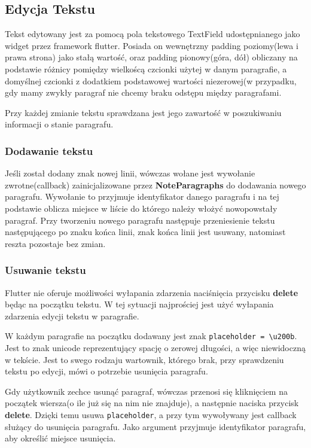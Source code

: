 \subsection{Edycja Tekstu}

Tekst edytowany jest za pomocą pola tekstowego TextField udostępnianego jako widget przez framework flutter. Posiada on wewnętrzny padding poziomy(lewa i prawa strona) jako stałą wartość, oraz padding pionowy(góra, dół) obliczany na podstawie różnicy pomiędzy wielkoścą czcionki użytej w danym paragrafie, a domyślnej czcionki z dodatkiem podstawowej wartości niezerowej(w przypadku, gdy mamy zwykły paragraf nie chcemy braku odstępu między paragrafami.

Przy każdej zmianie tekstu sprawdzana jest jego zawartość w poszukiwaniu informacji o stanie paragrafu.

\subsubsection{Dodawanie tekstu}

Jeśli został dodany znak nowej linii, wówczas wołane jest wywołanie zwrotne(callback) zainicjalizowane przez \textbf{NoteParagraphs} do dodawania nowego paragrafu. Wywołanie to przyjmuje identyfikator danego paragrafu i na tej podstawie oblicza miejsce w liście do którego należy włożyć nowopowstały paragraf. Przy tworzeniu nowego paragrafu następuje przeniesienie tekstu następującego po znaku końca linii, znak końca linii jest usuwany, natomiast reszta pozostaje bez zmian.

\subsubsection{Usuwanie tekstu}
\label{eq:usuwanieTekstu}

Flutter nie oferuje możliwości wyłapania zdarzenia naciśnięcia przycisku \textbf{delete} będąc na początku tekstu. W tej sytuacji najprościej jest użyć wyłapania zdarzenia edycji tekstu w paragrafie.

W każdym paragrafie na początku dodawany jest znak \verb|placeholder = \u200b|. Jest to znak unicode reprezentujący spację o zerowej długości, a więc niewidoczną w tekście. Jest to swego rodzaju wartownik, którego brak, przy sprawdzeniu tekstu po edycji, mówi o potrzebie usunięcia paragrafu.

Gdy użytkownik zechce usunąć paragraf, wówczas przenosi się kliknięciem na początek wiersza(o ile już się na nim nie znajduje), a następnie naciska przycisk \textbf{delete}. Dzięki temu usuwa \verb|placeholder|, a przy tym wywoływany jest callback służący do usunięcia paragrafu. Jako argument przyjmuje identyfikator paragrafu, aby określić miejsce usunięcia.


